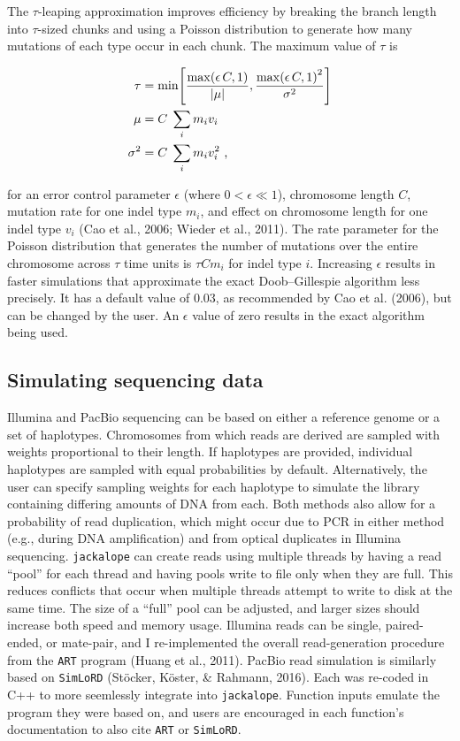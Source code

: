 \documentclass[12pt,]{article}
\let\originalleft\left
\let\originalright\right
\renewcommand{\left}{\mathopen{}\mathclose\bgroup\originalleft}
\renewcommand{\right}{\aftergroup\egroup\originalright}
\begin{document}
The \(\tau\)-leaping approximation improves efficiency by breaking the branch length
into \(\tau\)-sized chunks and using a Poisson distribution to generate how many
mutations of each type occur in each chunk.
The maximum value of \(\tau\) is

\begin{align*}
\tau &= \min \left[ \frac { \max \left( \epsilon \, C, 1 \right) } { | \mu | }, \frac { \max \left( \epsilon \, C, 1 \right)^2 } { \sigma^2 } \right] \\
\mu &= C \; \sum_i{ m_i v_i } \\
\sigma^2 &= C \; \sum_i{ m_i v_i^2 } ~ \rlap{,}
\end{align*}

for an error control parameter \(\epsilon\) (where \(0 < \epsilon \ll 1\)),
chromosome length \(C\),
mutation rate for one indel type \(m_i\), and
effect on chromosome length for one indel type \(v_i\) (Cao et al., 2006; Wieder et al., 2011).
The rate parameter for the Poisson distribution that generates the number of
mutations over the entire chromosome across \(\tau\) time units is \(\tau C m_i\)
for indel type \(i\).
Increasing \(\epsilon\) results in faster simulations that
approximate the exact Doob--Gillespie algorithm less precisely.
It has a default value of 0.03, as recommended by Cao et al. (2006), but can be changed
by the user.
An \(\epsilon\) value of zero results in the exact algorithm being used.

\hypertarget{simulating-sequencing-data}{%
\subsection{Simulating sequencing data}\label{simulating-sequencing-data}}

Illumina and PacBio sequencing can be based on either a reference genome or a
set of haplotypes.
Chromosomes from which reads are derived are sampled with weights proportional to
their length.
If haplotypes are provided, individual haplotypes are sampled with equal probabilities
by default.
Alternatively, the user can specify sampling weights for each haplotype
to simulate the library containing differing amounts of DNA from each.
Both methods also allow for a probability of read duplication, which might occur
due to PCR in either method (e.g., during DNA amplification) and
from optical duplicates in Illumina sequencing.
\texttt{jackalope} can create reads using multiple threads by having a read ``pool'' for
each thread and having pools write to file only when they are full.
This reduces conflicts that occur when multiple threads attempt to write to disk
at the same time.
The size of a ``full'' pool can be adjusted, and larger sizes should increase both
speed and memory usage.
Illumina reads can be single, paired-ended, or mate-pair, and I re-implemented the
overall read-generation procedure from the \texttt{ART} program (Huang et al., 2011).
PacBio read simulation is similarly based on \texttt{SimLoRD} (Stöcker, Köster, \& Rahmann, 2016).
Each was re-coded in C++ to more seemlessly integrate into \texttt{jackalope}.
Function inputs emulate the program they were based on,
and users are encouraged in each function's documentation to also cite
\texttt{ART} or \texttt{SimLoRD}.
\end{document}
